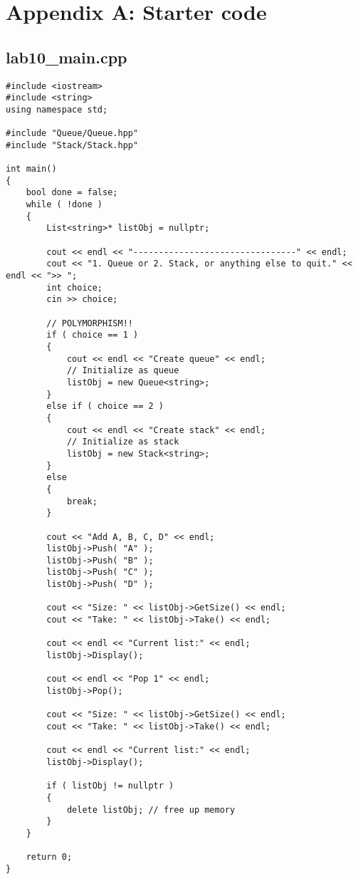 \documentclass[a4paper,12pt,oneside]{book}
\begin{document}
    \newpage
    \section{Appendix A: Starter code}

\subsection*{lab10\_main.cpp}

\begin{lstlisting}[style=code]
#include <iostream>
#include <string>
using namespace std;

#include "Queue/Queue.hpp"
#include "Stack/Stack.hpp"

int main()
{
    bool done = false;
    while ( !done )
    {
        List<string>* listObj = nullptr;

        cout << endl << "--------------------------------" << endl;
        cout << "1. Queue or 2. Stack, or anything else to quit." << endl << ">> ";
        int choice;
        cin >> choice;

        // POLYMORPHISM!!
        if ( choice == 1 )
        {
            cout << endl << "Create queue" << endl;
            // Initialize as queue
            listObj = new Queue<string>;
        }
        else if ( choice == 2 )
        {
            cout << endl << "Create stack" << endl;
            // Initialize as stack
            listObj = new Stack<string>;
        }
        else
        {
            break;
        }

        cout << "Add A, B, C, D" << endl;
        listObj->Push( "A" );
        listObj->Push( "B" );
        listObj->Push( "C" );
        listObj->Push( "D" );

        cout << "Size: " << listObj->GetSize() << endl;
        cout << "Take: " << listObj->Take() << endl;

        cout << endl << "Current list:" << endl;
        listObj->Display();

        cout << endl << "Pop 1" << endl;
        listObj->Pop();

        cout << "Size: " << listObj->GetSize() << endl;
        cout << "Take: " << listObj->Take() << endl;

        cout << endl << "Current list:" << endl;
        listObj->Display();

        if ( listObj != nullptr )
        {
            delete listObj; // free up memory
        }
    }

    return 0;
}

\end{lstlisting}
\end{document}
